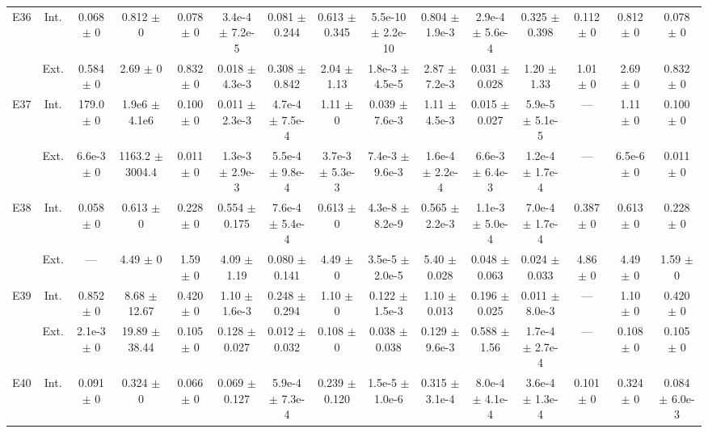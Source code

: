 \begin{table}[htbp]
{\begin{tabular}{@{}ccccccccccccccc@{}}
\cline{2-15}
\multirow{2}{*}{E36} & Int. & 0.068 $\pm$ 0 & 0.812 $\pm$ 0 & 0.078 $\pm$ 0 & 3.4e-4 $\pm$ 7.2e-5 & 0.081 $\pm$ 0.244 & 0.613 $\pm$ 0.345 & 5.5e-10 $\pm$ 2.2e-10 & 0.804 $\pm$ 1.9e-3 & 2.9e-4 $\pm$ 5.6e-4 & 0.325 $\pm$ 0.398 & 0.112 $\pm$ 0 & 0.812 $\pm$ 0 & 0.078 $\pm$ 0 \\
 & Ext. & 0.584 $\pm$ 0 & 2.69 $\pm$ 0 & 0.832 $\pm$ 0 & 0.018 $\pm$ 4.3e-3 & 0.308 $\pm$ 0.842 & 2.04 $\pm$ 1.13 & 1.8e-3 $\pm$ 4.5e-5 & 2.87 $\pm$ 7.2e-3 & 0.031 $\pm$ 0.028 & 1.20 $\pm$ 1.33 & 1.01 $\pm$ 0 & 2.69 $\pm$ 0 & 0.832 $\pm$ 0 \\
\cline{2-15}
\multirow{2}{*}{E37} & Int. & 179.0 $\pm$ 0 & 1.9e6 $\pm$ 4.1e6 & 0.100 $\pm$ 0 & 0.011 $\pm$ 2.3e-3 & 4.7e-4 $\pm$ 7.5e-4 & 1.11 $\pm$ 0 & 0.039 $\pm$ 7.6e-3 & 1.11 $\pm$ 4.5e-3 & 0.015 $\pm$ 0.027 & 5.9e-5 $\pm$ 5.1e-5 & --- & 1.11 $\pm$ 0 & 0.100 $\pm$ 0 \\
 & Ext. & 6.6e-3 $\pm$ 0 & 1163.2 $\pm$ 3004.4 & 0.011 $\pm$ 0 & 1.3e-3 $\pm$ 2.9e-3 & 5.5e-4 $\pm$ 9.8e-4 & 3.7e-3 $\pm$ 5.3e-3 & 7.4e-3 $\pm$ 9.6e-3 & 1.6e-4 $\pm$ 2.2e-4 & 6.6e-3 $\pm$ 6.4e-3 & 1.2e-4 $\pm$ 1.7e-4 & --- & 6.5e-6 $\pm$ 0 & 0.011 $\pm$ 0 \\
\cline{2-15}
\multirow{2}{*}{E38} & Int. & 0.058 $\pm$ 0 & 0.613 $\pm$ 0 & 0.228 $\pm$ 0 & 0.554 $\pm$ 0.175 & 7.6e-4 $\pm$ 5.4e-4 & 0.613 $\pm$ 0 & 4.3e-8 $\pm$ 8.2e-9 & 0.565 $\pm$ 2.2e-3 & 1.1e-3 $\pm$ 5.0e-4 & 7.0e-4 $\pm$ 1.7e-4 & 0.387 $\pm$ 0 & 0.613 $\pm$ 0 & 0.228 $\pm$ 0 \\
 & Ext. & --- & 4.49 $\pm$ 0 & 1.59 $\pm$ 0 & 4.09 $\pm$ 1.19 & 0.080 $\pm$ 0.141 & 4.49 $\pm$ 0 & 3.5e-5 $\pm$ 2.0e-5 & 5.40 $\pm$ 0.028 & 0.048 $\pm$ 0.063 & 0.024 $\pm$ 0.033 & 4.86 $\pm$ 0 & 4.49 $\pm$ 0 & 1.59 $\pm$ 0 \\
\cline{2-15}
\multirow{2}{*}{E39} & Int. & 0.852 $\pm$ 0 & 8.68 $\pm$ 12.67 & 0.420 $\pm$ 0 & 1.10 $\pm$ 1.6e-3 & 0.248 $\pm$ 0.294 & 1.10 $\pm$ 0 & 0.122 $\pm$ 1.5e-3 & 1.10 $\pm$ 0.013 & 0.196 $\pm$ 0.025 & 0.011 $\pm$ 8.0e-3 & --- & 1.10 $\pm$ 0 & 0.420 $\pm$ 0 \\
 & Ext. & 2.1e-3 $\pm$ 0 & 19.89 $\pm$ 38.44 & 0.105 $\pm$ 0 & 0.128 $\pm$ 0.027 & 0.012 $\pm$ 0.032 & 0.108 $\pm$ 0 & 0.038 $\pm$ 0.038 & 0.129 $\pm$ 9.6e-3 & 0.588 $\pm$ 1.56 & 1.7e-4 $\pm$ 2.7e-4 & --- & 0.108 $\pm$ 0 & 0.105 $\pm$ 0 \\
\cline{2-15}
\multirow{2}{*}{E40} & Int. & 0.091 $\pm$ 0 & 0.324 $\pm$ 0 & 0.066 $\pm$ 0 & 0.069 $\pm$ 0.127 & 5.9e-4 $\pm$ 7.3e-4 & 0.239 $\pm$ 0.120 & 1.5e-5 $\pm$ 1.0e-6 & 0.315 $\pm$ 3.1e-4 & 8.0e-4 $\pm$ 4.1e-4 & 3.6e-4 $\pm$ 1.3e-4 & 0.101 $\pm$ 0 & 0.324 $\pm$ 0 & 0.084 $\pm$ 6.0e-3 \\

\end{tabular}}
\end{table}
